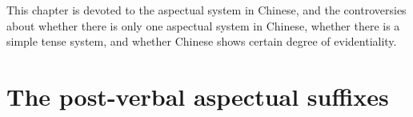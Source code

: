 This chapter is devoted to the aspectual system in Chinese, 
and the controversies about whether there is only one aspectual system in Chinese, 
whether there is a simple tense system, and whether Chinese shows certain degree of evidentiality.

\section{The post-verbal aspectual suffixes}\label{sec:post-verbal-aspect}